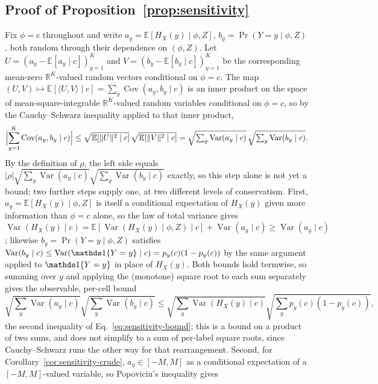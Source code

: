 \subsection{Proof of Proposition~\ref{prop:sensitivity}}
Fix $\phi=c$ throughout and write $a_y=\mathbb E[H_X(y)\mid\phi,Z]$,
$b_y=\Pr(Y=y\mid\phi,Z)$, both random through their dependence on $(\phi,Z)$. Let
$U=(a_y-\mathbb E[a_y\mid c])_{y=1}^K$ and $V=(b_y-\mathbb E[b_y\mid c])_{y=1}^K$ be the
corresponding mean-zero $\mathbb R^K$-valued random vectors conditional on $\phi=c$. The
map $(U,V)\mapsto\mathbb E[\langle U,V\rangle\mid c]=\sum_y\operatorname{Cov}(a_y,b_y\mid c)$
is an inner product on the space of mean-square-integrable $\mathbb R^K$-valued random
variables conditional on $\phi=c$, so by the Cauchy--Schwarz inequality applied to that
inner product,
\[
\Bigl|\sum_{y=1}^K\operatorname{Cov}(a_y,b_y\mid c)\Bigr|
\le\sqrt{\mathbb E[\lVert U\rVert^2\mid c]}\,\sqrt{\mathbb E[\lVert V\rVert^2\mid c]}
=\sqrt{\textstyle\sum_y\operatorname{Var}(a_y\mid c)}\,\sqrt{\textstyle\sum_y\operatorname{Var}(b_y\mid c)}.
\]
By the definition of $\rho$, the left side equals
$|\rho|\sqrt{\sum_y\operatorname{Var}(a_y\mid c)}\sqrt{\sum_y\operatorname{Var}(b_y\mid c)}$
exactly, so this step alone is not yet a bound; two further steps supply one, at two
different levels of conservatism. First, $a_y=\mathbb E[H_X(y)\mid\phi,Z]$ is itself a
conditional expectation of $H_X(y)$ given more information than $\phi=c$ alone, so the
law of total variance gives $\operatorname{Var}(H_X(y)\mid c)=\mathbb
E[\operatorname{Var}(H_X(y)\mid\phi,Z)\mid c]+\operatorname{Var}(a_y\mid c)\ge
\operatorname{Var}(a_y\mid c)$; likewise $b_y=\Pr(Y=y\mid\phi,Z)$ satisfies
$\operatorname{Var}(b_y\mid c)\le\operatorname{Var}(\ind\{Y=y\}\mid c)=p_y(c)(1-p_y(c))$ by
the same argument applied to $\ind\{Y=y\}$ in place of $H_X(y)$. Both bounds hold
termwise, so summing over $y$ and applying the (monotone) square root to each sum
separately gives the observable, per-cell bound
\[
\sqrt{\textstyle\sum_y\operatorname{Var}(a_y\mid c)}\sqrt{\textstyle\sum_y\operatorname{Var}(b_y\mid c)}
\le\sqrt{\textstyle\sum_y\operatorname{Var}(H_X(y)\mid c)}\sqrt{\textstyle\sum_yp_y(c)(1-p_y(c))},
\]
the second inequality of Eq.~\eqref{eq:sensitivity-bound}; this is a bound on a product of
two sums, and does not simplify to a sum of per-label square roots, since Cauchy--Schwarz
runs the other way for that rearrangement. Second, for
Corollary~\ref{cor:sensitivity-crude}, $a_y\in[-M,M]$ as a conditional expectation of a
$[-M,M]$-valued variable, so Popoviciu's inequality gives
